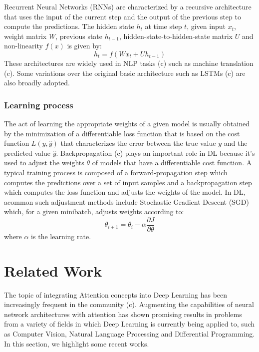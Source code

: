 \documentclass[English]{style/ic-tese-v3}
\begin{document}
Recurrent Neural Networks (RNNs) are characterized by a recursive architecture
that uses the input of the current step and the output of the previous
step to compute the predictions.
The hidden state $h_t$ at time step $t$, given input $x_t$, weight matrix $W$,
previous state $h_{t-1}$, hidden-state-to-hidden-state matrix $U$ and
non-linearity $f(x)$ is given by:
$$h_t = f\left(Wx_t + Uh_{t-1}\right)$$
These architectures are widely used in NLP tasks (c) such as
machine translation (c).
Some variations over the original basic architecture such as
LSTMs (c) are also broadly adopted.

\subsection{Learning process}
The act of learning the appropriate weights of a given model
is usually obtained by the minimization of a differentiable loss function
that is based on the cost function $L(y, \hat{y})$ that characterizes the error
between the true value $y$ and the predicted value $\hat{y}$.
Backpropagation (c) plays an important role in DL because it's used
to adjust the weights $\theta$ of models that have a
differentiable cost function.
A typical training process is composed of a forward-propagation
step which computes the predictions over a set of input samples
and a backpropagation step which computes the loss function
and adjusts the weights of the model.
In DL, acommon such adjustment methods include Stochastic Gradient Descent (SGD)
which, for a given minibatch, adjusts weights according to:
$$\theta_{i+1} = \theta_i - \alpha\frac{\partial{J}}{\partial{\theta}}$$
where $\alpha$ is the learning rate.

\let\clearpage\relax

\chapter{Related Work}
The topic of integrating Attention concepts into Deep Learning has been increasingly frequent
in the community (c).
Augmenting the capabilities of neural network architectures with attention has shown promising results
in problems from a variety of fields in which Deep Learning is currently being applied to, such as
Computer Vision, Natural Language Processing and Differential Programming.
In this section, we highlight some recent works.

\end{document}
